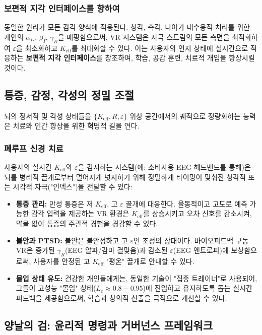 \documentclass[12pt,a4paper]{article}
\begin{document}
	\subsubsection{보편적 지각 인터페이스를 향하여}
	동일한 원리가 모든 감각 양식에 적용된다. 청각, 촉각, 나아가 내수용적 처리를 위한 개인의 \(\alpha_D\), \(\beta_I\), \(\gamma_R\)을 매핑함으로써, VR 시스템은 자극 스트림의 모든 측면을 최적화하여 \(\varepsilon\)을 최소화하고 \(K_{\mathrm{eff}}\)를 최대화할 수 있다. 이는 사용자의 인지 상태에 실시간으로 적응하는 \textbf{보편적 지각 인터페이스}를 창조하여, 학습, 공감 훈련, 치료적 개입을 향상시킬 것이다.
	
	\subsection{통증, 감정, 각성의 정밀 조절}
	
	뇌의 정서적 및 각성 상태들을 \(\{K_{\mathrm{eff}}, R, \varepsilon\}\) 위상 공간에서의 궤적으로 정량화하는 능력은 치료와 인간 향상을 위한 혁명적 길을 연다.
	
	\subsubsection{폐루프 신경 치료}
	사용자의 실시간 \(K_{\mathrm{eff}}\)와 \(\varepsilon\)을 감시하는 시스템(예: 소비자용 EEG 헤드밴드를 통해)은 뇌를 병리적 끌개로부터 멀어지게 넛지하기 위해 정밀하게 타이밍이 맞춰진 청각적 또는 시각적 자극("인덱스")을 전달할 수 있다:
	\begin{itemize}
		\item \textbf{통증 관리:} 만성 통증은 저 \(K_{\mathrm{eff}}\), 고 \(\varepsilon\) 끌개에 대응한다. 율동적이고 고도로 예측 가능한 감각 입력을 제공하는 VR 환경은 \(K_{\mathrm{eff}}\)를 상승시키고 오차 신호를 감소시켜, 약물 없이 통증의 주관적 경험을 경감할 수 있다.
		\item \textbf{불안과 PTSD:} 불안은 불안정하고 고 \(\varepsilon\)인 조정의 상태이다. 바이오피드백 구동 VR은 증가된 \(\gamma_R\)(EEG 알파/감마 결맞음)과 감소된 \(\varepsilon\)(EEG 엔트로피)에 보상함으로써, 사용자를 안정된 고 \(K_{\mathrm{eff}}\) "평온" 끌개로 안내할 수 있다.
		\item \textbf{몰입 상태 유도:} 건강한 개인들에게는, 동일한 기술이 "집중 트레이너"로 사용되어, 그들이 고성능 "몰입" 상태(\(L_c \approx 0.8-0.95\))에 진입하고 유지하도록 돕는 실시간 피드백을 제공함으로써, 학습과 창의적 산출을 극적으로 개선할 수 있다.
	\end{itemize}
	
	\subsection{양날의 검: 윤리적 명령과 거버넌스 프레임워크}
	
\end{document}
